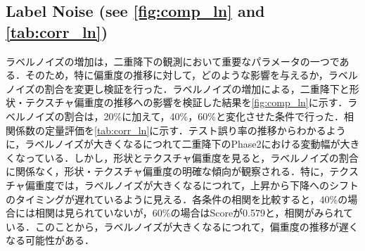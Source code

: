 \newpage

\subsection[Label Noise]{Label Noise (see \cref{fig:comp_ln} and \cref{tab:corr_ln})}

ラベルノイズの増加は，二重降下の観測において重要なパラメータの一つである．そのため，特に偏重度の推移に対して，どのような影響を与えるか，ラベルノイズの割合を変更し検証を行った．ラベルノイズの増加による，二重降下と形状・テクスチャ偏重度の推移への影響を検証した結果を\cref{fig:comp_ln}に示す．ラベルノイズの割合は，20\%に加えて，40\%，60\%と変化させた条件で行った．相関係数の定量評価を\cref{tab:corr_ln}に示す．テスト誤り率の推移からわかるように，ラベルノイズが大きくなるにつれて二重降下のPhase2における変動幅が大きくなっている．しかし，形状とテクスチャ偏重度を見ると，ラベルノイズの割合に関係なく，形状・テクスチャ偏重度の明確な傾向が観察される．特に，テクスチャ偏重度では，ラベルノイズが大きくなるにつれて，上昇から下降へのシフトのタイミングが遅れているように見える．各条件の相関を比較すると，40\%の場合には相関は見られていないが，60\%の場合はScoreが0.579と，相関がみられている．このことから，ラベルノイズが大きくなるにつれて，偏重度の推移が遅くなる可能性がある．

